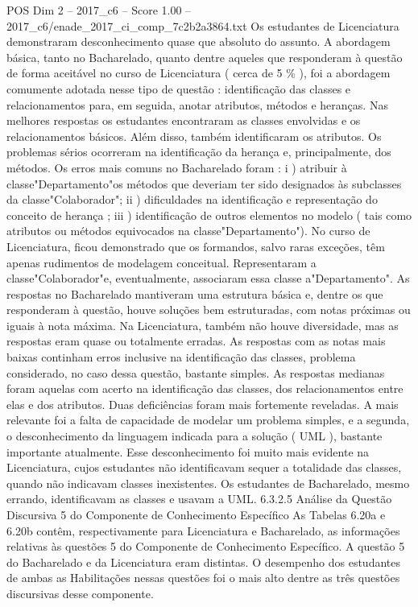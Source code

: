 \begin{textsample}{POS Dim 2 – 2017\_c6 – Score 1.00 – 2017\_c6/enade\_2017\_ci\_comp\_7c2b2a3864.txt}
Os estudantes de Licenciatura demonstraram desconhecimento quase que absoluto do assunto.
A abordagem básica, tanto no Bacharelado, quanto dentre aqueles que responderam à questão de forma aceitável no curso de Licenciatura ( cerca de 5 \% ), foi a abordagem comumente adotada nesse tipo de questão : identificação das classes e relacionamentos para, em seguida, anotar atributos, métodos e heranças.
Nas melhores respostas os estudantes encontraram as classes envolvidas e os relacionamentos básicos.
Além disso, também identificaram os atributos.
Os problemas sérios ocorreram na identificação da herança e, principalmente, dos métodos.
Os erros mais comuns no Bacharelado foram : i ) atribuir à classe"Departamento"os métodos que deveriam ter sido designados às subclasses da classe"Colaborador"; ii ) dificuldades na identificação e representação do conceito de herança ; iii ) identificação de outros elementos no modelo ( tais como atributos ou métodos equivocados na classe"Departamento").
No curso de Licenciatura, ficou demonstrado que os formandos, salvo raras exceções, têm apenas rudimentos de modelagem conceitual.
Representaram a classe"Colaborador"e, eventualmente, associaram essa classe a"Departamento".
As respostas no Bacharelado mantiveram uma estrutura básica e, dentre os que responderam à questão, houve soluções bem estruturadas, com notas próximas ou iguais à nota máxima.
Na Licenciatura, também não houve diversidade, mas as respostas eram quase ou totalmente erradas.
As respostas com as notas mais baixas continham erros inclusive na identificação das classes, problema considerado, no caso dessa questão, bastante simples.
As respostas medianas foram aquelas com acerto na identificação das classes, dos relacionamentos entre elas e dos atributos.
Duas deficiências foram mais fortemente reveladas.
A mais relevante foi a falta de capacidade de modelar um problema simples, e a segunda, o desconhecimento da linguagem indicada para a solução ( UML ), bastante importante atualmente.
Esse desconhecimento foi muito mais evidente na Licenciatura, cujos estudantes não identificavam sequer a totalidade das classes, quando não indicavam classes inexistentes.
Os estudantes de Bacharelado, mesmo errando, identificavam as classes e usavam a UML. 6.3.2.5 Análise da Questão Discursiva 5 do Componente de Conhecimento Específico As Tabelas 6.20a e 6.20b contêm, respectivamente para Licenciatura e Bacharelado, as informações relativas às questões 5 do Componente de Conhecimento Específico.
A questão 5 do Bacharelado e da Licenciatura eram distintas.
O desempenho dos estudantes de ambas as Habilitações nessas questões foi o mais alto dentre as três questões discursivas desse componente.

\end{textsample}
